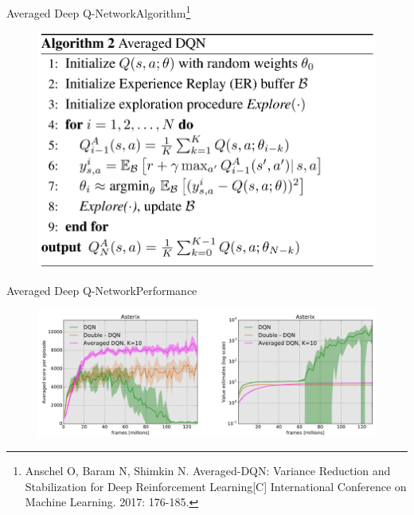 \documentclass{beamer}
\begin{document}
\begin{frame}{Averaged Deep Q-Network}{Algorithm\footnote{\tiny{Anschel O, Baram N, Shimkin N. Averaged-DQN: Variance Reduction and Stabilization for Deep Reinforcement Learning[C] International Conference on Machine Learning. 2017: 176-185.}}}
\begin{figure}[t]
	\includegraphics[width=0.7\columnwidth]{figures/adqn-alg.jpg}
\end{figure}
\end{frame}


\begin{frame}{Averaged Deep Q-Network}{Performance}
\begin{figure}[t]
	\includegraphics[width=0.88\columnwidth]{figures/adqn-performance.jpg}
\end{figure}
\end{frame}
\end{document}
